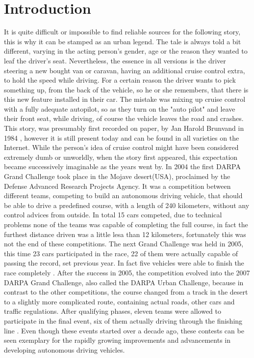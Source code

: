 
\chapter{Introduction}\label{chapter:introduction}

It is quite difficult or impossible to find reliable sources for the following story, this is why it can be stamped as an urban legend. The tale is always told a bit different, varying in the acting person's gender, age or the reason they wanted to leaf the driver's seat. Nevertheless, the essence in all versions is the driver steering a new bought van or caravan, having an additional cruise control extra, to hold the speed while driving. For a certain reason the driver wants to pick something up, from the back of the vehicle, so he or she remembers, that there is this new feature installed in their car. The mistake was mixing up cruise control with a fully adequate autopilot, so as they turn on the "auto pilot" and leave their front seat, while driving, of course the vehicle leaves the road and crashes. \newline
This story, was presumably first recorded on paper, by Jan Harold Brunvand in 1984 \cite{brunvand}, however it is still present today and can be found in all varieties on the Internet. While the person's idea of cruise control might have been considered extremely dumb or unworldly, when the story first appeared, this expectation became successively imaginable as the years went by. \newline
In 2004 the first DARPA Grand Challenge took place \cite{darpa2004} in the Mojave desert(USA), proclaimed by the Defense Advanced Research Projects Agency. It was a competition between different teams, competing to build an autonomous driving vehicle, that should be able to drive a predefined course, with a length of 240 kilometers, without any control advices from outside. In total 15 cars competed, due to technical problems none of the teams was capable of completing the full course, in fact the furthest distance driven was a little lesa than 12 kilometers, fortunately this was not the end of these competitions. \newline
The next Grand Challenge was held in 2005, this time 23 cars participated in the race, 22 of them were actually capable of passing the record, set previous year. In fact five vehicles were able to finish the race completely \cite{darpa2005}.\newline
After the success in 2005, the competition evolved into the 2007 DARPA Grand Challenge, also called the DARPA Urban Challenge, because in contrast to the other competitions, the course changed from a track in the desert to a slightly more complicated route, containing actual roads, other cars and traffic regulations. After qualifying phases, eleven teams were allowed to participate in the final event, six of them actually driving through the finishing line \cite{darpa2007}.\newline
Even though these events started over a decade ago, 
these contests can be seen exemplary for the rapidly growing improvements and advancements in developing autonomous driving vehicles. 